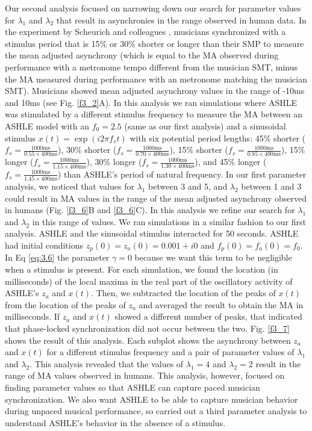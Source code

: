\documentclass{report}
\begin{document}
Our second analysis focused on narrowing down our search for parameter values for $\lambda_1$ and $\lambda_2$ that result in asynchronies in the range observed in human data. In the experiment by Scheurich and colleagues \cite{scheurich2018tapping}, musicians synchronized with a stimulus period that is 15\% or 30\% shorter or longer than their SMP to measure the mean adjusted asynchrony (which is equal to the MA observed during performance with a metronome tempo different from the musician SMT, minus the MA measured during performance with an metronome matching the musician SMT). Musicians showed mean adjusted asynchrony values in the range of -10ms and 10ms (see Fig.{} \ref{f3_2}A). In this analysis we ran simulations where ASHLE was stimulated by a different stimulus frequency to measure the MA between an ASHLE model with an $f_0 = 2.5$ (same as our first analysis) and a sinusoidal stimulus $x(t) = \exp(i2\pi f_s t)$ with six potential period lengths: 45\% shorter ($f_s = \frac{1000\text{ms}}{0.55 \times 400\text{ms}}$), 30\% shorter ($f_s = \frac{1000\text{ms}}{0.70 \times 400\text{ms}}$), 15\% shorter ($f_s = \frac{1000\text{ms}}{0.85 \times 400\text{ms}}$), 15\% longer ($f_s = \frac{1000\text{ms}}{1.15 \times 400\text{ms}}$), 30\% longer ($f_s = \frac{1000\text{ms}}{1.30 \times 400\text{ms}}$), and 45\% longer ($f_s = \frac{1000\text{ms}}{1.45 \times 400\text{ms}}$) than ASHLE's period of natural frequency. In our first parameter analysis, we noticed that values for $\lambda_1$ between 3 and 5, and $\lambda_2$ between 1 and 3 could result in MA values in the range of the mean adjusted asynchrony observed in humans (Fig.{} \ref{f3_6}B and \ref{f3_6}C). In this analysis we refine our search for $\lambda_1$ and $\lambda_2$ in this range of values. We ran simulations in a similar fashion to our first analysis. ASHLE and the sinusoidal stimulus interacted for 50 seconds. ASHLE had initial conditions $z_p(0)=z_a(0)= 0.001 + i0$ and $f_p(0)=f_a(0)=f_0$. In Eq \eqref{eq:3.6} the parameter $\gamma=0$ because we want this term to be negligible when a stimulus is present. For each simulation, we found the location (in milliseconds) of the local maxima in the real part of the oscillatory activity of ASHLE's $z_a$ and $x(t)$. Then, we subtracted the location of the peaks of $x(t)$ from the location of the peaks of $z_a$ and averaged the result to obtain the MA in milliseconds. If $z_a$ and $x(t)$ showed a different number of peaks, that indicated that phase-locked synchronization did not occur between the two. Fig.{} \ref{f3_7} shows the result of this analysis. Each subplot shows the asynchrony between $z_a$ and $x(t)$ for a different stimulus frequency and a pair of parameter values of $\lambda_1$ and $\lambda_2$. This analysis revealed that the values of $\lambda_1 = 4$ and $\lambda_2 = 2$ result in the range of MA values observed in humans. This analysis, however, focused on finding parameter values so that ASHLE can capture paced musician synchronization. We also want ASHLE to be able to capture musician behavior during unpaced musical performance, so carried out a third parameter analysis to understand ASHLE's behavior in the absence of a stimulus.
\end{document}
